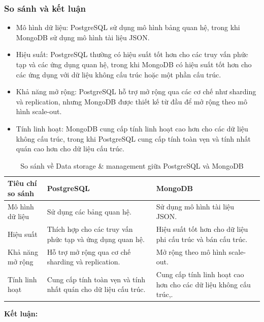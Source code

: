 \subsubsection{So sánh và kết luận}
\begin{itemize}
    \item Mô hình dữ liệu: PostgreSQL sử dụng mô hình bảng quan hệ, trong khi MongoDB sử dụng mô hình tài liệu JSON.
    \item Hiệu suất: PostgreSQL thường có hiệu suất tốt hơn cho các truy vấn phức tạp và các ứng dụng quan hệ, trong khi MongoDB có hiệu suất tốt hơn cho các ứng dụng với dữ liệu không cấu trúc hoặc một phần cấu trúc.
    \item Khả năng mở rộng: PostgreSQL hỗ trợ mở rộng qua các cơ chế như sharding và replication, nhưng MongoDB được thiết kế từ đầu để mở rộng theo mô hình scale-out.
    \item Tính linh hoạt: MongoDB cung cấp tính linh hoạt cao hơn cho các dữ liệu không cấu trúc, trong khi PostgreSQL cung cấp tính toàn vẹn và tính nhất quán cao hơn cho dữ liệu cấu trúc.
\end{itemize}

\begin{table}[H]
    \centering
    \begin{tabular}{|L{3.2cm}|L{5cm}|L{5cm}|} \hline 
         \textbf{Tiêu chí so sánh }&  \textbf{PostgreSQL}&  \textbf{MongoDB}\\ \hline 
         Mô hình dữ liệu &  Sử dụng các bảng quan hệ. & Sử dụng mô hình tài liệu JSON.\\ \hline 
         Hiệu suất &  Thích hợp cho các truy vấn phức tạp và ứng dụng quan hệ. & Hiệu suất tốt hơn cho dữ liệu phi cấu trúc và bán cấu trúc.\\ \hline 
         Khả năng mở rộng &  Hỗ trợ mở rộng qua cơ chế sharding và replication. &  Mở rộng theo mô hình scale-out.\\ \hline
         Tính linh hoạt &  Cung cấp tính toàn vẹn và tính nhất quán cho dữ liệu cấu trúc. &  Cung cấp tính linh hoạt cao hơn cho các dữ liệu không cấu trúc,.\\ \hline 
    \end{tabular}
    \caption{So sánh về Data storage \& management giữa PostgreSQL và MongoDB}
    \label{tab:data_storage&management}
\end{table}

\textbf{Kết luận:} 
\newpage